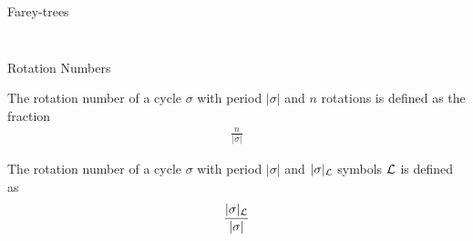 \begin{frame}{Farey-trees}
\begin{columns}
\begin{column}{.5 \textwidth}
\begin{figure}
			\end{figure}
		\end{column}
	\end{columns}
\end{frame}

\begin{frame}{Rotation Numbers}
	\vspace{-1em}
	\begin{definition}
		The rotation number of a cycle $\sigma$ with period $|\sigma|$ and $n$ rotations is defined as the fraction
		\begin{align*}
			\frac{n}{|\sigma|}
		\end{align*}
	\end{definition}
	\pause
	\begin{definition}
		The rotation number of a cycle $\sigma$ with period $|\sigma|$ and $|\sigma|_{\mathcal{L}}$ symbols $\mathcal{L}$ is defined as
		\begin{align*}
			\frac{|\sigma|_{\mathcal{L}}}{|\sigma|}
		\end{align*}
	\end{definition}
	\vspace{-3em}
	\begin{flushright}
		\cite{Keener80}
	\end{flushright}
\end{frame}

